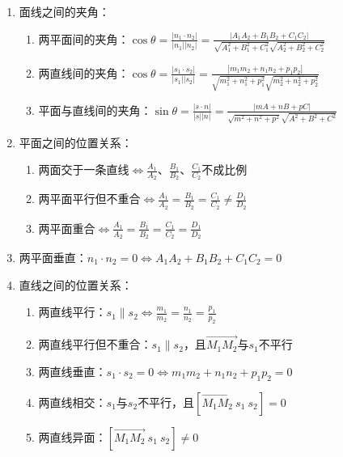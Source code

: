 \documentclass[UTF8]{ctexart}
\theoremstyle{remark}
\begin{document}
\begin{enumerate}
\item 面线之间的夹角：
\begin{enumerate}
	\item 两平面间的夹角：\(\cos\theta=\frac{|n_{1}\cdot n_{2}|}{|n_{1}||n_{2}|}=\frac{|A_{1}A_{2}+B_{1}B_{2}+C_{1}C_{2}|}{\sqrt{A_{1}^{2}+B_{1}^{2}+C_{1}^{2}}\sqrt{A_{2}^{2}+B_{2}^{2}+C_{2}^{2}}}\)
	\item 两直线间的夹角：\(\cos\theta=\frac{|s_{1}\cdot s_{2}|}{|s_{1}||s_{2}|}=\frac{|m_{1}m_{2}+n_{1}n_{2}+p_{1}p_{2}|}{\sqrt{m_{1}^{2}+n_{1}^{2}+p_{1}^{2}}\sqrt{m_{2}^{2}+n_{2}^{2}+p_{2}^{2}}}\)
	\item 平面与直线间的夹角：\(\sin\theta=\frac{|s\cdot n|}{|s||n|}=\frac{|mA+nB+pC|}{\sqrt{m^{2}+n^{2}+p^{2}}\sqrt{A^{2}+B^{2}+C^{2}}}\)
\end{enumerate}

\item 平面之间的位置关系：
\begin{enumerate}
	\item 两面交于一条直线\(\Leftrightarrow\frac{A_{1}}{A_{2}}\)、\(\frac{B_{1}}{B_{2}}\)、\(\frac{C_{1}}{C_{2}}\)不成比例
	\item 两平面平行但不重合\(\Leftrightarrow\frac{A_{1}}{A_{2}}=\frac{B_{1}}{B_{2}}=\frac{C_{1}}{C_{2}}\neq\frac{D_{1}}{D_{2}}\)
	\item 两平面重合\(\Leftrightarrow\frac{A_{1}}{A_{2}}=\frac{B_{1}}{B_{2}}=\frac{C_{1}}{C_{2}}=\frac{D_{1}}{D_{2}}\)
\end{enumerate}

\item 两平面垂直：\(n_1 \cdot n_2 = 0 \Leftrightarrow A_1A_2 + B_1B_2 + C_1C_2 = 0\)

\item 直线之间的位置关系：
\begin{enumerate}
	\item 两直线平行：\(s_1 \parallel s_2 \Leftrightarrow \frac{m_1}{m_2} = \frac{n_1}{n_2} = \frac{p_1}{p_2}\)
	\item 两直线平行但不重合：\(s_1 \parallel s_2\)，且\(\overrightarrow{M_1M_2}\)与\(s_1\)不平行
	\item 两直线垂直：\(s_1 \cdot s_2 = 0 \Leftrightarrow m_1m_2 + n_1n_2 + p_1p_2 = 0\)
	\item 两直线相交：\(s_1\)与\(s_2\)不平行，且\([\overrightarrow{M_1M_2}\ s_1\ s_2] = 0\)
	\item 两直线异面：\([\overrightarrow{M_1M_2}\ s_1\ s_2] \neq 0\)
\end{enumerate}


\end{enumerate}
\end{document}
